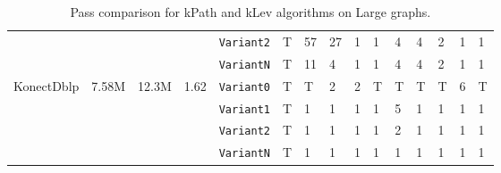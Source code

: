 \begin{table}[h!]
{\begin{tabular}{ |p{1.6cm}|p{0.9cm}|p{0.9cm}|p{0.8cm} |p{1.3cm}|p{.8cm}| p{.8cm}|p{.8cm}|p{.8cm}|p{.8cm}|p{.8cm}| p{.8cm}|p{.8cm}|p{.8cm}|p{.8cm}| }
& & &  & \texttt{Variant2} & T & 57 & 27 & 1 & 1& 4 & 4 & 2 & 1 & 1\\
& & &  & \texttt{VariantN} & T & 11 & 4 & 1 & 1& 4 & 4 & 2 & 1 & 1\\
\hline
\multirow{4}{*}{KonectDblp} & \multirow{4}{*}{7.58M} & \multirow{4}{*}{12.3M} & \multirow{4}{*}{1.62}
& \texttt{Variant0} & T & T & 2 & 2 & T& T & T & T & 6 & T\\
& & &  & \texttt{Variant1} & T & 1 & 1 & 1 & 1& 5 & 1 & 1 & 1 & 1\\
& & &  & \texttt{Variant2} & T & 1 & 1 & 1 & 1& 2 & 1 & 1 & 1 & 1\\
& & &  & \texttt{VariantN} & T & 1 & 1 & 1 & 1& 1 & 1 & 1 & 1 & 1\\
\hline
\end{tabular}}
\caption{Pass comparison for kPath and kLev algorithms on Large graphs.}
\label{label}
\end{table}
